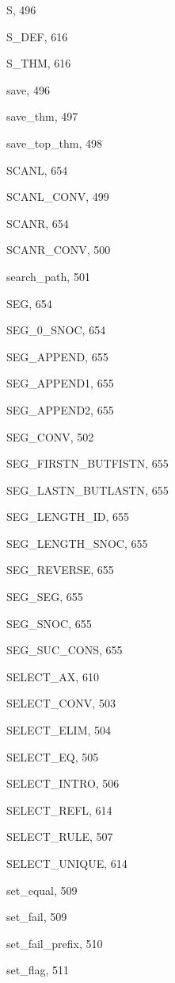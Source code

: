 \begin{theindex}
  \item {\ptt S}, 496
  \item {\ptt S\_DEF}, 616
  \item {\ptt S\_THM}, 616
  \item {\ptt save}, 496
  \item {\ptt save\_thm}, 497
  \item {\ptt save\_top\_thm}, 498
  \item {\ptt SCANL}, 654
  \item {\ptt SCANL\_CONV}, 499
  \item {\ptt SCANR}, 654
  \item {\ptt SCANR\_CONV}, 500
  \item {\ptt search\_path}, 501
  \item {\ptt SEG}, 654
  \item {\ptt SEG\_0\_SNOC}, 654
  \item {\ptt SEG\_APPEND}, 655
  \item {\ptt SEG\_APPEND1}, 655
  \item {\ptt SEG\_APPEND2}, 655
  \item {\ptt SEG\_CONV}, 502
  \item {\ptt SEG\_FIRSTN\_BUTFISTN}, 655
  \item {\ptt SEG\_LASTN\_BUTLASTN}, 655
  \item {\ptt SEG\_LENGTH\_ID}, 655
  \item {\ptt SEG\_LENGTH\_SNOC}, 655
  \item {\ptt SEG\_REVERSE}, 655
  \item {\ptt SEG\_SEG}, 655
  \item {\ptt SEG\_SNOC}, 655
  \item {\ptt SEG\_SUC\_CONS}, 655
  \item {\ptt SELECT\_AX}, 610
  \item {\ptt SELECT\_CONV}, 503
  \item {\ptt SELECT\_ELIM}, 504
  \item {\ptt SELECT\_EQ}, 505
  \item {\ptt SELECT\_INTRO}, 506
  \item {\ptt SELECT\_REFL}, 614
  \item {\ptt SELECT\_RULE}, 507
  \item {\ptt SELECT\_UNIQUE}, 614
  \item {\ptt set\_equal}, 509
  \item {\ptt set\_fail}, 509
  \item {\ptt set\_fail\_prefix}, 510
  \item {\ptt set\_flag}, 511

\end{theindex}
